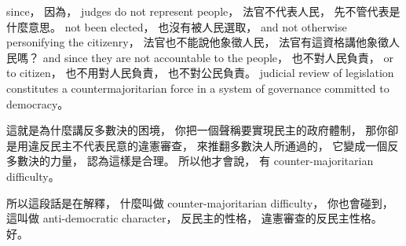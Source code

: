 \hypertarget{w02:cue:463}{}since，
\hypertarget{w02:cue:464}{}因為，
\hypertarget{w02:cue:465}{}judges do not represent people，
\hypertarget{w02:cue:466}{}法官不代表人民，
\hypertarget{w02:cue:467}{}先不管代表是什麼意思。
\hypertarget{w02:cue:468}{}not been elected，
\hypertarget{w02:cue:469}{}也沒有被人民選取，
\hypertarget{w02:cue:470}{}and not otherwise
\hypertarget{w02:cue:471}{}personifying the citizenry，
\hypertarget{w02:cue:472}{}法官也不能說他象徵人民，
\hypertarget{w02:cue:473}{}法官有這資格講他象徵人民嗎？
\hypertarget{w02:cue:474}{}and since they are not accountable to the people，
\hypertarget{w02:cue:475}{}也不對人民負責，
\hypertarget{w02:cue:476}{}or to citizen，
\hypertarget{w02:cue:477}{}也不用對人民負責，
\hypertarget{w02:cue:478}{}也不對公民負責。
\hypertarget{w02:cue:479}{}judicial review of legislation constitutes a countermajoritarian force
\hypertarget{w02:cue:480}{}in a system of governance committed to democracy。

\hypertarget{w02:cue:481}{}這就是為什麼講反多數決的困境，
\hypertarget{w02:cue:482}{}你把一個聲稱要實現民主的政府體制，
\hypertarget{w02:cue:483}{}那你卻是用違反民主不代表民意的違憲審查，
\hypertarget{w02:cue:484}{}來推翻多數決人所通過的，
\hypertarget{w02:cue:485}{}它變成一個反多數決的力量，
\hypertarget{w02:cue:486}{}認為這樣是合理。
\hypertarget{w02:cue:487}{}所以他才會說，
\hypertarget{w02:cue:488}{}有 counter-majoritarian difficulty。

\hypertarget{w02:cue:489}{}所以這段話是在解釋，
\hypertarget{w02:cue:490}{}什麼叫做 counter-majoritarian difficulty，
\hypertarget{w02:cue:491}{}你也會碰到，
\hypertarget{w02:cue:492}{}這叫做 anti-democratic character，
\hypertarget{w02:cue:493}{}反民主的性格，
\hypertarget{w02:cue:494}{}違憲審查的反民主性格。
\hypertarget{w02:cue:495}{}好。

